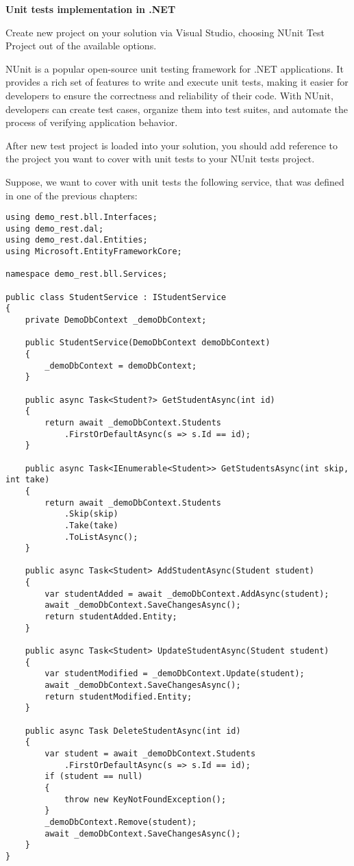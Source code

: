 \medskip

\begin{center}
\textbf{Unit tests implementation in .NET}
\end{center}

Create new project on your solution via Visual Studio, choosing NUnit Test Project out of the available options.

NUnit is a popular open-source unit testing framework for .NET applications. It provides a rich set of features to write and execute unit tests, making it easier for developers to ensure the correctness and reliability of their code. With NUnit, developers can create test cases, organize them into test suites, and automate the process of verifying application behavior.

After new test project is loaded into your solution, you should add reference to the project you want to cover with unit tests to your NUnit tests project.

Suppose, we want to cover with unit tests the following service, that was defined in one of the previous chapters:

\begin{lstlisting}
using demo_rest.bll.Interfaces;
using demo_rest.dal;
using demo_rest.dal.Entities;
using Microsoft.EntityFrameworkCore;

namespace demo_rest.bll.Services;

public class StudentService : IStudentService
{
    private DemoDbContext _demoDbContext;

    public StudentService(DemoDbContext demoDbContext)
    {
        _demoDbContext = demoDbContext;
    }

    public async Task<Student?> GetStudentAsync(int id)
    {
        return await _demoDbContext.Students
            .FirstOrDefaultAsync(s => s.Id == id);
    }

    public async Task<IEnumerable<Student>> GetStudentsAsync(int skip, int take)
    {
        return await _demoDbContext.Students
            .Skip(skip)
            .Take(take)
            .ToListAsync();
    }

    public async Task<Student> AddStudentAsync(Student student)
    {
        var studentAdded = await _demoDbContext.AddAsync(student);
        await _demoDbContext.SaveChangesAsync();
        return studentAdded.Entity;
    }

    public async Task<Student> UpdateStudentAsync(Student student)
    {
        var studentModified = _demoDbContext.Update(student);
        await _demoDbContext.SaveChangesAsync();
        return studentModified.Entity;
    }

    public async Task DeleteStudentAsync(int id)
    {
        var student = await _demoDbContext.Students
            .FirstOrDefaultAsync(s => s.Id == id);
        if (student == null)
        {
            throw new KeyNotFoundException();
        }
        _demoDbContext.Remove(student);
        await _demoDbContext.SaveChangesAsync();
    }
}
\end{lstlisting}


